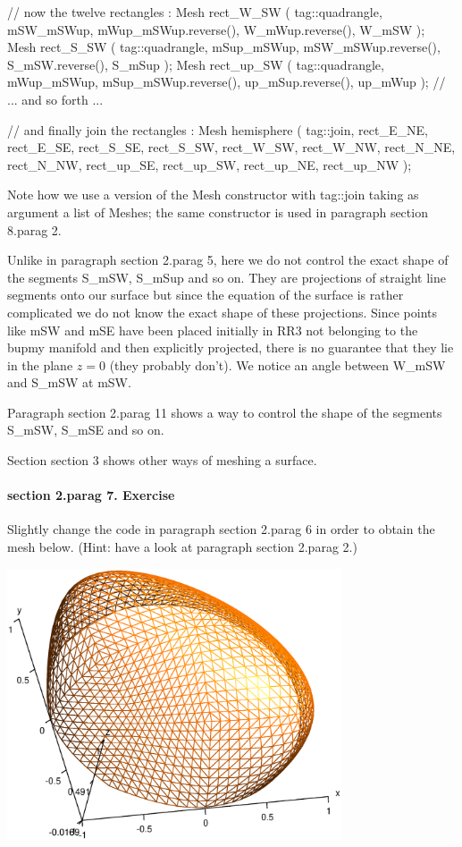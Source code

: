    // now the twelve rectangles :
   Mesh rect_W_SW  ( tag::quadrangle,
      mSW_mSWup, mWup_mSWup.reverse(), W_mWup.reverse(), W_mSW );
   Mesh rect_S_SW  ( tag::quadrangle,
      mSup_mSWup, mSW_mSWup.reverse(), S_mSW.reverse(), S_mSup );
   Mesh rect_up_SW ( tag::quadrangle,
      mWup_mSWup, mSup_mSWup.reverse(), up_mSup.reverse(), up_mWup );
   // ... and so forth ...

   // and finally join the rectangles :
   Mesh hemisphere ( tag::join,
      { rect_E_NE, rect_E_SE, rect_S_SE, rect_S_SW, rect_W_SW, rect_W_NW,
        rect_N_NE, rect_N_NW, rect_up_SE, rect_up_SW, rect_up_NE, rect_up_NW } );
\endverbatim

Note how we use a version of the {\codett Mesh} constructor with {\codett tag::join} taking as
argument a list of {\codett Mesh}es; the same constructor is used in paragraph \numb section
8.\numb parag 2.

Unlike in paragraph \numb section 2.\numb parag 5, here we do not control the
exact shape of the segments {\codett S\_mSW}, {\codett S\_mSup} and so on.
They are projections of straight line segments onto our surface but since the equation
of the surface is rather complicated we do not know the exact shape of these projections.
Since points like {\codett mSW} and {\codett mSE} have been placed initially in {\codett RR3}
not belonging to the {\codett bupmy} manifold and then explicitly {\codett project}ed,
there is no guarantee that they lie in the plane $ z = 0 $ (they probably don't).
We notice an angle between {\codett W\_mSW} and {\codett S\_mSW} at {\codett mSW}.

Paragraph \numb section 2.\numb parag 11 shows a way to control the shape of the segments
{\codett S\_mSW}, {\codett S\_mSE} and so on.

Section \numb section 3 shows other ways of meshing a surface.


\paragraph{\numb section 2.\numb parag 7. Exercise}

Slightly change the code in paragraph \numb section 2.\numb parag 6
in order to obtain the mesh below.
(Hint: have a look at paragraph \numb section 2.\numb parag 2.)

\centerline{\includegraphics[width=99mm]{hemisphere-1.eps}}
\vfil\eject


